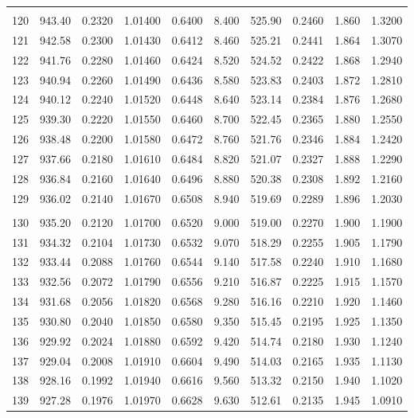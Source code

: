 \documentclass[letter,twosides,10pt]{article}
\begin{document}
\begin{longtable}{|c|c|c|c|c|c|c|c|c|c|}
 & & & & & & & & & \\ 
120 & 943.40 & 0.2320 & 1.01400 & 0.6400 &  8.400 & 525.90 & 0.2460 & 1.860 &  1.3200 \\
121 & 942.58 & 0.2300 & 1.01430 & 0.6412 &  8.460 & 525.21 & 0.2441 & 1.864 &  1.3070 \\
122 & 941.76 & 0.2280 & 1.01460 & 0.6424 &  8.520 & 524.52 & 0.2422 & 1.868 &  1.2940 \\
123 & 940.94 & 0.2260 & 1.01490 & 0.6436 &  8.580 & 523.83 & 0.2403 & 1.872 &  1.2810 \\
124 & 940.12 & 0.2240 & 1.01520 & 0.6448 &  8.640 & 523.14 & 0.2384 & 1.876 &  1.2680 \\
125 & 939.30 & 0.2220 & 1.01550 & 0.6460 &  8.700 & 522.45 & 0.2365 & 1.880 &  1.2550 \\
126 & 938.48 & 0.2200 & 1.01580 & 0.6472 &  8.760 & 521.76 & 0.2346 & 1.884 &  1.2420 \\
127 & 937.66 & 0.2180 & 1.01610 & 0.6484 &  8.820 & 521.07 & 0.2327 & 1.888 &  1.2290 \\
128 & 936.84 & 0.2160 & 1.01640 & 0.6496 &  8.880 & 520.38 & 0.2308 & 1.892 &  1.2160 \\
129 & 936.02 & 0.2140 & 1.01670 & 0.6508 &  8.940 & 519.69 & 0.2289 & 1.896 &  1.2030 \\
 & & & & & & & & & \\ 
130 & 935.20 & 0.2120 & 1.01700 & 0.6520 &  9.000 & 519.00 & 0.2270 & 1.900 &  1.1900 \\
131 & 934.32 & 0.2104 & 1.01730 & 0.6532 &  9.070 & 518.29 & 0.2255 & 1.905 &  1.1790 \\
132 & 933.44 & 0.2088 & 1.01760 & 0.6544 &  9.140 & 517.58 & 0.2240 & 1.910 &  1.1680 \\
133 & 932.56 & 0.2072 & 1.01790 & 0.6556 &  9.210 & 516.87 & 0.2225 & 1.915 &  1.1570 \\
134 & 931.68 & 0.2056 & 1.01820 & 0.6568 &  9.280 & 516.16 & 0.2210 & 1.920 &  1.1460 \\
135 & 930.80 & 0.2040 & 1.01850 & 0.6580 &  9.350 & 515.45 & 0.2195 & 1.925 &  1.1350 \\
136 & 929.92 & 0.2024 & 1.01880 & 0.6592 &  9.420 & 514.74 & 0.2180 & 1.930 &  1.1240 \\
137 & 929.04 & 0.2008 & 1.01910 & 0.6604 &  9.490 & 514.03 & 0.2165 & 1.935 &  1.1130 \\
138 & 928.16 & 0.1992 & 1.01940 & 0.6616 &  9.560 & 513.32 & 0.2150 & 1.940 &  1.1020 \\
139 & 927.28 & 0.1976 & 1.01970 & 0.6628 &  9.630 & 512.61 & 0.2135 & 1.945 &  1.0910 \\

\end{longtable}
\end{document}
